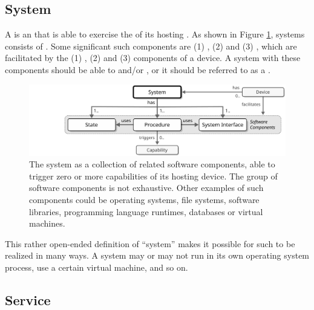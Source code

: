 \subsection{System}
\label{sec:reference-model:system}

A  is an   that is able to exercise the  of its hosting .
As shown in Figure \ref{fig:system}, systems consists of .
Some significant such components are (1) , (2)  and (3) , which are facilitated by the (1) , (2)  and (3)  components of a device.
A system with these components should be able to  and/or  , or it should be referred to as a .

\begin{figure}[ht!]
  \centering
  \includegraphics[scale=0.9]{figures/system}
  \caption{
    The system as a collection of related software components, able to trigger zero or more capabilities of its hosting device.
    The group of software components is not exhaustive.
    Other examples of such components could be operating systems, file systems, software libraries, programming language runtimes, databases or virtual machines.
  }
  \label{fig:system}
\end{figure}

This rather open-ended definition of ``system'' makes it possible for such to be realized in many ways.
A system may or may not run in its own operating system process, use a certain virtual machine, and so on.

\subsection{Service}
\label{sec:reference-model:service}

